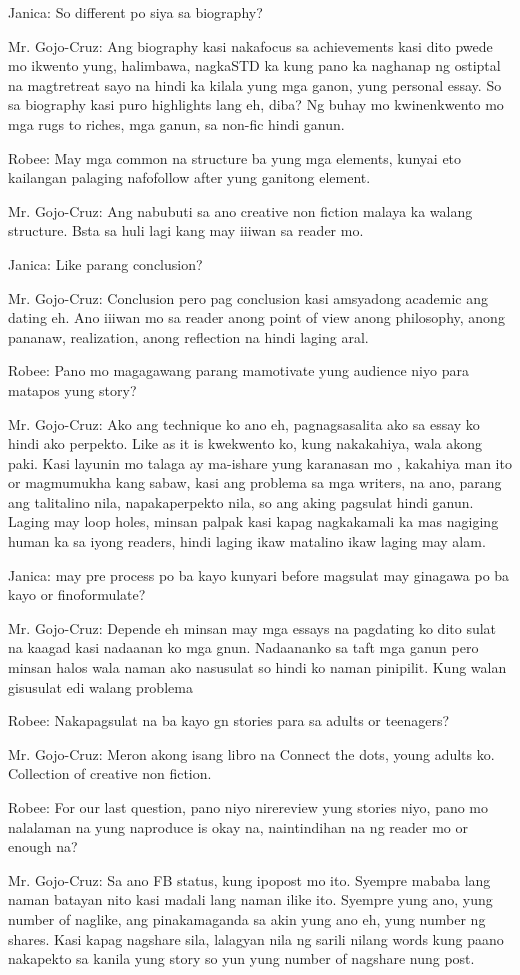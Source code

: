 Janica: So different po siya sa biography?

Mr. Gojo-Cruz: Ang biography kasi nakafocus sa achievements kasi dito pwede mo ikwento yung, halimbawa, nagkaSTD ka kung pano ka naghanap ng ostiptal na magtretreat sayo na hindi ka kilala yung mga ganon, yung personal essay. So sa biography kasi puro highlights lang eh, diba? Ng buhay mo kwinenkwento mo mga rugs to riches, mga ganun, sa non-fic hindi ganun.

Robee: May mga common na structure ba yung mga elements, kunyai eto kailangan palaging nafofollow after yung ganitong element.

Mr. Gojo-Cruz: Ang nabubuti sa ano creative non fiction malaya ka walang structure. Bsta sa huli lagi kang may iiiwan sa reader mo.

Janica: Like parang conclusion?

Mr. Gojo-Cruz: Conclusion pero pag conclusion kasi amsyadong academic ang dating eh. Ano iiiwan mo sa reader anong point of view anong philosophy, anong pananaw, realization, anong reflection na hindi laging aral.

Robee: Pano mo magagawang  parang mamotivate yung audience niyo para matapos yung story?

Mr. Gojo-Cruz: Ako ang technique ko ano eh, pagnagsasalita ako sa essay ko hindi ako perpekto. Like as it is kwekwento ko, kung nakakahiya, wala akong paki. Kasi layunin mo talaga ay ma-ishare yung karanasan mo , kakahiya man ito or magmumukha kang sabaw, kasi ang problema sa mga writers, na ano, parang ang talitalino nila, napakaperpekto nila, so ang aking pagsulat hindi ganun. Laging may loop holes, minsan palpak kasi kapag nagkakamali ka mas nagiging human ka sa iyong readers, hindi laging ikaw matalino ikaw laging may alam. 

Janica: may pre process po ba kayo kunyari before magsulat may ginagawa po ba kayo or finoformulate?

Mr. Gojo-Cruz: Depende eh minsan may mga essays na pagdating ko dito sulat na kaagad kasi nadaanan ko mga gnun. Nadaananko sa taft mga ganun pero minsan halos wala naman ako nasusulat so hindi ko naman pinipilit. Kung walan gisusulat edi walang problema

Robee: Nakapagsulat na ba kayo gn stories para sa adults or teenagers?

Mr. Gojo-Cruz: Meron akong isang libro na Connect the dots, young adults ko. Collection of creative non fiction.

Robee: For our last question, pano niyo nirereview yung stories niyo, pano mo nalalaman na yung naproduce is okay na, naintindihan na ng reader mo or enough na?

Mr. Gojo-Cruz: Sa ano FB status, kung ipopost mo ito. Syempre mababa lang naman batayan nito kasi madali lang naman ilike ito. Syempre yung ano, yung number of naglike, ang pinakamaganda sa akin yung ano eh, yung number ng shares. Kasi kapag nagshare sila, lalagyan nila ng sarili nilang words kung paano nakapekto sa kanila yung story so yun yung number of nagshare nung post.
